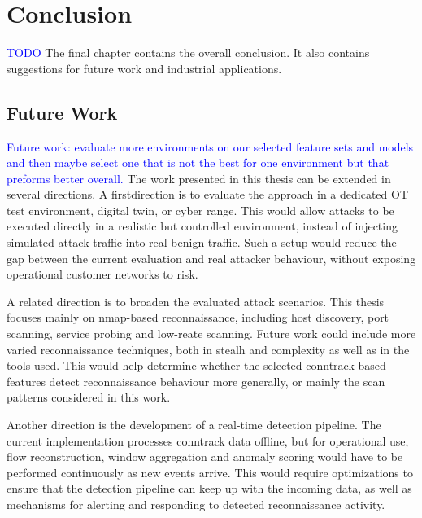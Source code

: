 \chapter{Conclusion}
\label{ch:conclusion}
\textcolor{blue}{TODO}
The final chapter contains the overall conclusion. It also contains
suggestions for future work and industrial applications.


\section{Future Work}
\textcolor{blue}{Future work: evaluate more environments on our selected feature sets and models and then maybe select one that is not the best for one environment but that preforms better overall.}
The work presented in this thesis can be extended in several directions. A firstdirection  is to evaluate the approach in a dedicated OT test environment, digital twin, or cyber range. This would allow attacks to be executed directly in a realistic but controlled environment, instead of injecting simulated attack traffic into real benign  traffic. Such a setup would reduce the gap between the current evaluation and real attacker behaviour, without exposing operational customer networks to risk.

A related direction is to broaden the evaluated attack scenarios. This thesis focuses mainly on nmap-based reconnaissance, including host discovery, port scanning, service probing and low-reate scanning. Future work could include more varied reconnaissance techniques, both in stealh and complexity as well as in the tools used. This would help determine whether the selected conntrack-based features detect reconnaissance behaviour more generally, or mainly the scan patterns considered in this work.

Another direction is the development of a real-time detection pipeline. The current implementation processes conntrack data offline, but for operational use, flow reconstruction, window aggregation and anomaly scoring would have to be performed continuously as new events arrive. This would require optimizations to ensure that the detection pipeline can keep up with the incoming data, as well as mechanisms for alerting and responding to detected reconnaissance activity.

